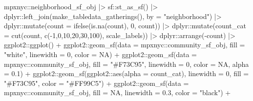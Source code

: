 \documentclass[
  letterpaper,
  DIV=11,
  numbers=noendperiod,
  oneside]{scrreprt}
\newenvironment{Shaded}{\begin{snugshade}}{\end{snugshade}}
\newcommand{\AttributeTok}[1]{\textcolor[rgb]{0.40,0.45,0.13}{#1}}
\newcommand{\ConstantTok}[1]{\textcolor[rgb]{0.56,0.35,0.01}{#1}}
\newcommand{\DecValTok}[1]{\textcolor[rgb]{0.68,0.00,0.00}{#1}}
\newcommand{\FloatTok}[1]{\textcolor[rgb]{0.68,0.00,0.00}{#1}}
\newcommand{\FunctionTok}[1]{\textcolor[rgb]{0.28,0.35,0.67}{#1}}
\newcommand{\NormalTok}[1]{\textcolor[rgb]{0.00,0.23,0.31}{#1}}
\newcommand{\SpecialCharTok}[1]{\textcolor[rgb]{0.37,0.37,0.37}{#1}}
\newcommand{\StringTok}[1]{\textcolor[rgb]{0.13,0.47,0.30}{#1}}
\begin{document}
\begin{Shaded}
\begin{Highlighting}[]
\NormalTok{mpxnyc}\SpecialCharTok{::}\NormalTok{neighborhood\_sf\_obj }\SpecialCharTok{|\textgreater{}}
\NormalTok{   sf}\SpecialCharTok{::}\FunctionTok{st\_as\_sf}\NormalTok{() }\SpecialCharTok{|\textgreater{}}
\NormalTok{  dplyr}\SpecialCharTok{::}\FunctionTok{left\_join}\NormalTok{(}\FunctionTok{make\_tabledata\_gatherings}\NormalTok{(), }\AttributeTok{by =} \StringTok{"neighborhood"}\NormalTok{) }\SpecialCharTok{|\textgreater{}}
\NormalTok{  dplyr}\SpecialCharTok{::}\FunctionTok{mutate}\NormalTok{(}\AttributeTok{count =} \FunctionTok{ifelse}\NormalTok{(}\FunctionTok{is.na}\NormalTok{(count), }\DecValTok{0}\NormalTok{, count)) }\SpecialCharTok{|\textgreater{}}
\NormalTok{  dplyr}\SpecialCharTok{::}\FunctionTok{mutate}\NormalTok{(}\AttributeTok{count\_cat =} \FunctionTok{cut}\NormalTok{(count, }\FunctionTok{c}\NormalTok{(}\SpecialCharTok{{-}}\DecValTok{1}\NormalTok{,}\DecValTok{0}\NormalTok{,}\DecValTok{10}\NormalTok{,}\DecValTok{20}\NormalTok{,}\DecValTok{30}\NormalTok{,}\DecValTok{100}\NormalTok{), scale\_labels)) }\SpecialCharTok{|\textgreater{}}
\NormalTok{  dplyr}\SpecialCharTok{::}\FunctionTok{arrange}\NormalTok{(}\SpecialCharTok{{-}}\NormalTok{count) }\SpecialCharTok{|\textgreater{}}
\NormalTok{  ggplot2}\SpecialCharTok{::}\FunctionTok{ggplot}\NormalTok{() }\SpecialCharTok{+}
\NormalTok{  ggplot2}\SpecialCharTok{::}\FunctionTok{geom\_sf}\NormalTok{(}\AttributeTok{data =}\NormalTok{ mpxnyc}\SpecialCharTok{::}\NormalTok{community\_sf\_obj, }\AttributeTok{fill =} \StringTok{"white"}\NormalTok{, }\AttributeTok{linewidth =} \DecValTok{0}\NormalTok{, }\AttributeTok{color =} \ConstantTok{NA}\NormalTok{) }\SpecialCharTok{+}
\NormalTok{  ggplot2}\SpecialCharTok{::}\FunctionTok{geom\_sf}\NormalTok{(}\AttributeTok{data =}\NormalTok{ mpxnyc}\SpecialCharTok{::}\NormalTok{community\_sf\_obj, }\AttributeTok{fill =} \StringTok{"\#F73C95"}\NormalTok{, }\AttributeTok{linewidth =} \DecValTok{0}\NormalTok{, }\AttributeTok{color =} \ConstantTok{NA}\NormalTok{, }\AttributeTok{alpha =} \FloatTok{0.1}\NormalTok{) }\SpecialCharTok{+}
\NormalTok{  ggplot2}\SpecialCharTok{::}\FunctionTok{geom\_sf}\NormalTok{(ggplot2}\SpecialCharTok{::}\FunctionTok{aes}\NormalTok{(}\AttributeTok{alpha =}\NormalTok{ count\_cat), }\AttributeTok{linewidth =} \DecValTok{0}\NormalTok{, }\AttributeTok{fill =} \StringTok{"\#F73C95"}\NormalTok{, }\AttributeTok{color =} \StringTok{"\#FF99C5"}\NormalTok{) }\SpecialCharTok{+}
\NormalTok{  ggplot2}\SpecialCharTok{::}\FunctionTok{geom\_sf}\NormalTok{(}\AttributeTok{data =}\NormalTok{ mpxnyc}\SpecialCharTok{::}\NormalTok{community\_sf\_obj, }\AttributeTok{fill =} \ConstantTok{NA}\NormalTok{, }\AttributeTok{linewidth =} \FloatTok{0.3}\NormalTok{, }\AttributeTok{color =} \StringTok{"black"}\NormalTok{) }\SpecialCharTok{+}

\end{Highlighting}
\end{Shaded}
\end{document}
